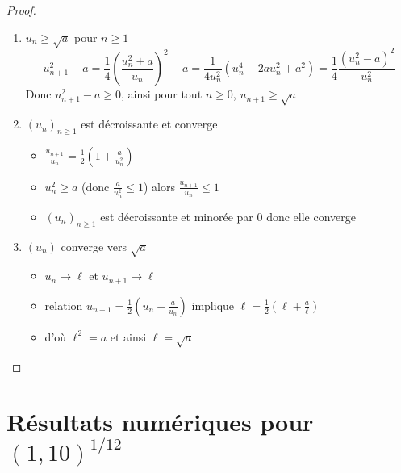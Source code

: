 \begin{frame}
\vspace*{-1ex}
\vspace*{-2ex}
\begin{proof} \vspace*{-1ex}
\pause
\begin{enumerate}
  \item $u_n \ge \sqrt{a}$ pour $n\ge1$
 \vspace*{-2ex}   
  $$u_{n+1}^2-a = \frac14 \left(\frac{u_n^2 + a}{u_n}\right)^2 - a 
  = \frac{1}{4u_n^2}(u_n^4-2au_n^2+a^2)=\frac14 \frac{(u_n^2-a)^2}{u_n^2}$$
\vspace*{-1ex}  
  Donc $u_{n+1}^2 - a \ge 0$, ainsi pour tout $n\ge 0$, $u_{n+1} \ge \sqrt{a}$
  
\pause  
  \item $(u_n)_{n\ge1}$ est décroissante et converge
  \begin{itemize}
    \item $\frac{u_{n+1}}{u_n} = \frac12 \left(1+\frac{a}{u_n^2}\right)$
    \item $u_n^2 \ge a$ (donc $\frac{a}{u_n^2}\le 1$) alors $\frac{u_{n+1}}{u_n} \le 1$
    \item $(u_n)_{n\ge1}$ est décroissante et minorée par $0$ donc elle converge
  \end{itemize}

\pause 
  \item $(u_n)$ converge vers $\sqrt{a}$
  \begin{itemize}
    \item $u_n \to \ell$ et $u_{n+1} \to \ell$
    \item relation $u_{n+1} = \frac12 \left(u_n+\frac{a}{u_n}\right)$ implique  $\ell = \frac12 \left(\ell+\frac{a}{\ell}\right)$
    \item d'où $\ell^2=a$ et ainsi $\ell = \sqrt{a}$ \qedhere
  \end{itemize}\vspace*{-1ex}   
\end{enumerate}

\end{proof}
\end{frame}


\section{Résultats numériques pour $(1,10)^{1/12}$}

